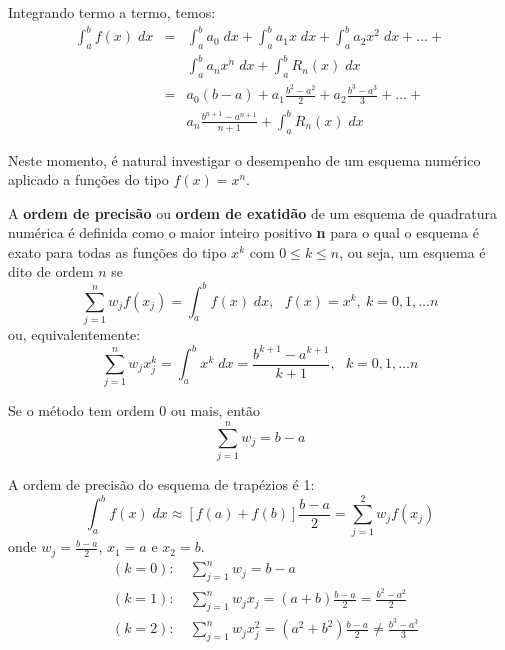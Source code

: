 Integrando termo a termo, temos:
\begin{eqnarray}
\int_a^bf(x)\;dx&=& \int_a^b a_0\;dx+\int_a^ba_1x\;dx + \int_a^ba_2x^2\;dx+\ldots+\\
&& \int_a^ba_n x^n\;dx +\int_a^bR_n(x)\;dx\\
&=& a_0(b-a)+a_1\frac{b^2-a^2}{2} + a_2\frac{b^3-a^3}{3} +\ldots+\\
&&a_n \frac{b^{n+1}-a^{n+1}}{n+1} +\int_a^bR_n(x)\;dx
\end{eqnarray}

Neste momento, é natural investigar o desempenho de um esquema numérico aplicado a funções do tipo $f(x)=x^n$.

\begin{defn} A {\bf ordem de precisão} ou {\bf ordem de exatidão} de um esquema de quadratura numérica é definida como o maior inteiro positivo {\bf n} para o qual o esquema é exato para todas as funções do tipo $x^k$ com $0\leq k\leq n$, ou seja,
um esquema é dito de ordem $n$ se
\begin{equation} \sum_{j=1}^n w_jf(x_j)=\int_a^b f(x)\;dx,~~~f(x)=x^k,~k=0,1,\ldots n \end{equation}
ou, equivalentemente:
\begin{equation} \sum_{j=1}^n w_jx_j^k=\int_a^b x^k\;dx=\frac{b^{k+1}-a^{k+1}}{k+1},~~~k=0,1,\ldots n \end{equation}
\end{defn}

\begin{obs} Se o método tem ordem $0$ ou mais, então
\begin{equation} \sum_{j=1}^n w_j=b-a \end{equation}
\end{obs}

\begin{ex}
A ordem de precisão do esquema de trapézios é 1:
\begin{equation} \int_a^b f(x)\;dx \approx \left[f(a)+f(b)\right]\frac{b-a}{2}=\sum_{j=1}^2w_jf(x_j) \end{equation}
onde $w_j=\frac{b-a}{2}$, $x_1=a$ e $x_2=b$.
\begin{eqnarray}
  &(k=0):\quad\sum_{j=1}^n w_j = b-a\\
  &(k=1):\quad\sum_{j=1}^n w_jx_j = (a+b)\frac{b-a}{2}=\frac{b^2-a^2}{2}\\
  &(k=2):\quad\sum_{j=1}^n w_jx_j^2 = (a^2+b^2)\frac{b-a}{2}\neq\frac{b^3-a^3}{3}
\end{eqnarray}
\end{ex}

